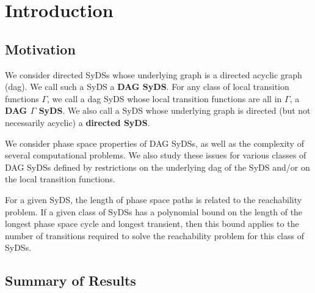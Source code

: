 \section{Introduction}
\label{sec:intro}

\subsection{Motivation}
\label{sse:motivation}


We consider directed SyDSs whose underlying graph is a directed
acyclic graph (dag).  We call such a SyDS a {\bf DAG SyDS}.  For
any class of local transition functions $\Gamma$, we call a dag
SyDS whose local transition functions are all in  $\Gamma$, a {\bf
DAG $\Gamma$ SyDS}.  We also call a SyDS whose underlying graph is
directed (but not necessarily acyclic) a {\bf directed SyDS}.


We consider phase space properties of DAG  SyDSs, as well as the
complexity of several computational problems.  We also study these
issues for various classes of DAG  SyDSs defined by restrictions
on the underlying dag of the SyDS and/or on the local transition
functions.

For a given SyDS, the length of  phase space paths is related to
the reachability problem.  If a given class of SyDSs has a polynomial
bound on the length of the longest phase space cycle and longest
transient, then this bound applies to the number of transitions
required to solve the reachability problem for this class of SyDSs.


\subsection{Summary of Results}
\label{sse:results}


